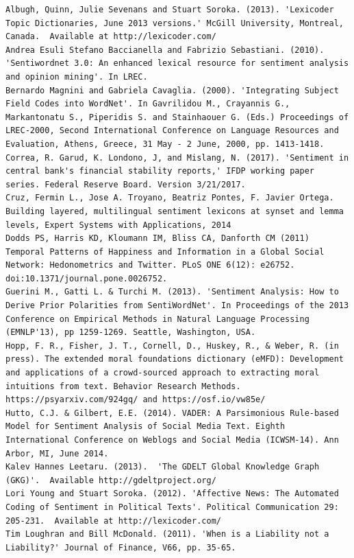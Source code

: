 \documentclass[12pt]{article}
\begin{document}
\footnotesize
\begin{lstlisting}
Albugh, Quinn, Julie Sevenans and Stuart Soroka. (2013). 'Lexicoder Topic Dictionaries, June 2013 versions.' McGill University, Montreal, Canada.  Available at http://lexicoder.com/
Andrea Esuli Stefano Baccianella and Fabrizio Sebastiani. (2010). 'Sentiwordnet 3.0: An enhanced lexical resource for sentiment analysis and opinion mining'. In LREC.
Bernardo Magnini and Gabriela Cavaglia. (2000). 'Integrating Subject Field Codes into WordNet'. In Gavrilidou M., Crayannis G., Markantonatu S., Piperidis S. and Stainhaouer G. (Eds.) Proceedings of LREC-2000, Second International Conference on Language Resources and Evaluation, Athens, Greece, 31 May - 2 June, 2000, pp. 1413-1418.
Correa, R. Garud, K. Londono, J, and Mislang, N. (2017). 'Sentiment in central bank's financial stability reports,' IFDP working paper series. Federal Reserve Board. Version 3/21/2017.
Cruz, Fermin L., Jose A. Troyano, Beatriz Pontes, F. Javier Ortega. Building layered, multilingual sentiment lexicons at synset and lemma levels, Expert Systems with Applications, 2014
Dodds PS, Harris KD, Kloumann IM, Bliss CA, Danforth CM (2011) Temporal Patterns of Happiness and Information in a Global Social Network: Hedonometrics and Twitter. PLoS ONE 6(12): e26752. doi:10.1371/journal.pone.0026752.
Guerini M., Gatti L. & Turchi M. (2013). 'Sentiment Analysis: How to Derive Prior Polarities from SentiWordNet'. In Proceedings of the 2013 Conference on Empirical Methods in Natural Language Processing (EMNLP'13), pp 1259-1269. Seattle, Washington, USA.
Hopp, F. R., Fisher, J. T., Cornell, D., Huskey, R., & Weber, R. (in press). The extended moral foundations dictionary (eMFD): Development and applications of a crowd-sourced approach to extracting moral intuitions from text. Behavior Research Methods. https://psyarxiv.com/924gq/ and https://osf.io/vw85e/
Hutto, C.J. & Gilbert, E.E. (2014). VADER: A Parsimonious Rule-based Model for Sentiment Analysis of Social Media Text. Eighth International Conference on Weblogs and Social Media (ICWSM-14). Ann Arbor, MI, June 2014.
Kalev Hannes Leetaru. (2013).  'The GDELT Global Knowledge Graph (GKG)'.  Available http://gdeltproject.org/
Lori Young and Stuart Soroka. (2012). 'Affective News: The Automated Coding of Sentiment in Political Texts'. Political Communication 29: 205-231.  Available at http://lexicoder.com/
Tim Loughran and Bill McDonald. (2011). 'When is a Liability not a Liability?' Journal of Finance, V66, pp. 35-65.
\end{lstlisting}
\end{document}
